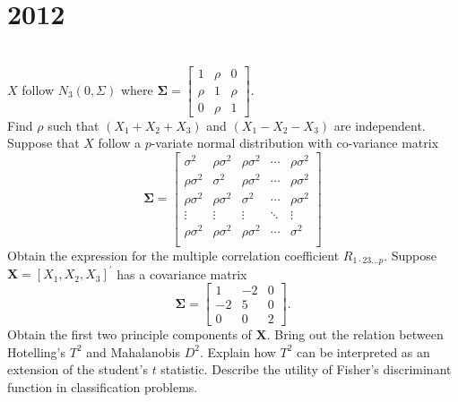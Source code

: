 \section*{2012}
\vspace{-.5cm}
\hrulefill \smallskip\\
 $X$ follow $N_3\left(0,\Sigma\right)$ where $\displaystyle \mathbf{\Sigma} =  \begin{bmatrix} 1 & \rho & 0 \\ \rho & 1 & \rho \\ 0 & \rho & 1 \end{bmatrix}$.\\ Find $\rho$ such that $(X_1+X_2+X_3)$ and $(X_1-X_2 -X_3)$ are independent.
\myline
{} Suppose that $X$ follow a $p$-variate normal distribution with co-variance matrix \[ \mathbf{\Sigma} = \begin{bmatrix} \sigma^2 & \rho\sigma^2 & \rho\sigma^2 & \cdots & \rho\sigma^2 \\
\rho\sigma^2 & \sigma^2 & \rho\sigma^2 & \cdots & \rho\sigma^2 \\
\rho\sigma^2 & \rho\sigma^2 & \sigma^2 & \cdots & \rho\sigma^2 \\
\vdots & \vdots & \vdots & \ddots & \vdots \\ 
\rho\sigma^2 & \rho\sigma^2 & \rho\sigma^2 & \cdots & \sigma^2 \\
\end{bmatrix} \] Obtain the expression for the multiple correlation coefficient $R_{1\cdot23\ldots p}$.
\myline
{} Suppose $\mathbf{X} = [X_1,X_2,X_3]^\prime$ has a covariance matrix
\[ \mathbf{\Sigma} = \begin{bmatrix} 1 & -2 & 0 \\ -2 & 5 & 0 \\ 0 & 0 & 2 \end{bmatrix}.\] Obtain the first two principle components of $\mathbf{X}$.
\myline
{} Bring out the relation between Hotelling's $T^2$ and Mahalanobis $D^2$. Explain how $T^2$ can be interpreted as an extension of the student's $t$ statistic. Describe the utility of Fisher's discriminant function in classification problems.